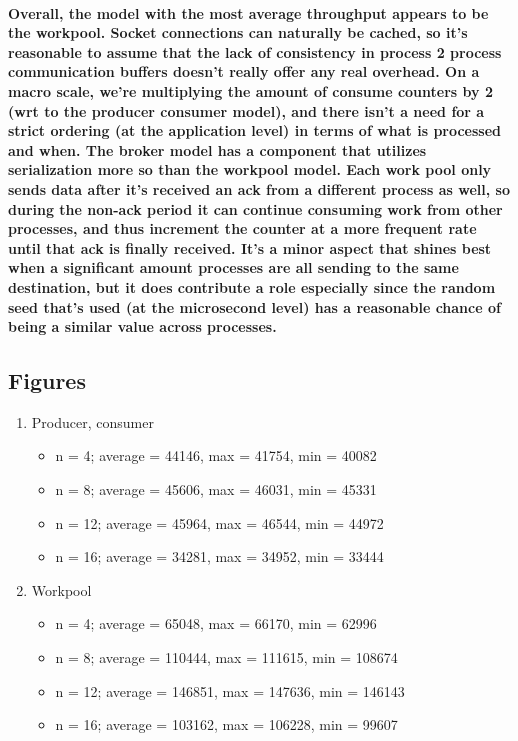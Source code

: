 \documentclass[8pt, a4paper, twoside, twoclumn, english]{extreport}
\begin{document}
\paragraph {
  Overall, the model with the most average throughput appears to be the workpool.
  Socket connections can naturally be cached, so it's reasonable to assume that
  the lack of consistency in process 2 process communication buffers doesn't
  really offer any real overhead. On a macro scale, we're multiplying the amount of
  consume counters by 2 (wrt to the producer consumer model),
  and there isn't a need for a strict ordering (at the application level)
  in terms of what is processed and when. The broker model has a component
  that utilizes serialization more so than the workpool model. Each work pool only sends data
  after it's received an ack from a different process as well, so during the
  non-ack period it can continue consuming work from other processes, and thus
  increment the counter at a more frequent rate until that ack is finally received.
  It's a minor aspect that shines best when a significant amount processes
  are all sending to the same destination, but it does contribute a role
  especially since the random seed that's used (at the microsecond level)
  has a reasonable chance of being a similar value across processes.
}

\subsection{Figures}

\begin{enumerate}
\item Producer, consumer
  \begin{itemize}
  \item n = 4; average = 44146, max = 41754, min = 40082
  \item n = 8; average = 45606, max = 46031, min = 45331
  \item n = 12; average = 45964, max = 46544, min = 44972
  \item n = 16; average = 34281, max = 34952, min = 33444
  \end{itemize}
\item Workpool
  \begin{itemize}
  \item n = 4; average = 65048, max = 66170, min = 62996
  \item n = 8; average = 110444, max = 111615, min = 108674
  \item n = 12; average = 146851, max = 147636, min = 146143
  \item n = 16; average = 103162, max = 106228, min = 99607
  \end{itemize}
\end{enumerate}
\end{document}
